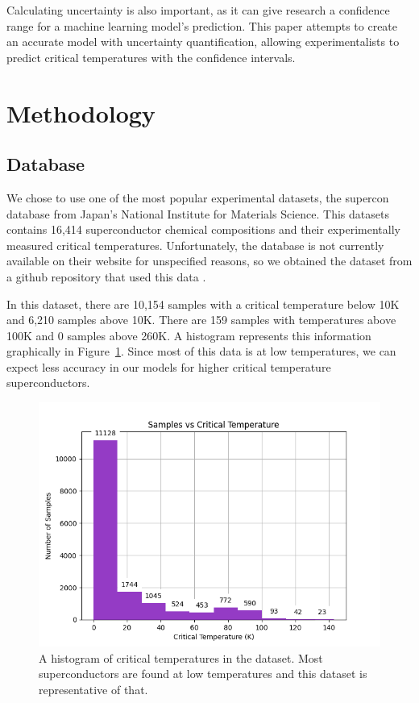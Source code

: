 \documentclass[twocolumn, nofootinbib, secnumarabic, amssymb, nobibnotes, aps, prd]{revtex4-2}
\begin{document}
Calculating uncertainty is also important, as it can give research a confidence range for a machine learning model's prediction. This paper attempts to create an accurate model with uncertainty quantification, allowing experimentalists to predict critical temperatures with the confidence intervals.

\section{Methodology}
\subsection{Database}
We chose to use one of the most popular experimental datasets, the supercon database from Japan's National Institute for Materials Science. This datasets contains 16,414 superconductor chemical compositions and their experimentally measured critical temperatures. Unfortunately, the database is not currently available on their website for unspecified reasons, so we obtained the dataset from a github repository that used this data \cite{vstanev1_2018}. 

In this dataset, there are 10,154 samples with a critical temperature below 10K and 6,210 samples above 10K. There are 159 samples with temperatures above 100K and 0 samples above 260K. A histogram represents this information graphically in Figure~\ref{fig:data-histogram}. Since most of this data is at low temperatures, we can expect less accuracy in our models for higher critical temperature superconductors.

 \begin{figure}[!htb]
    \centering %
    \includegraphics[width=\columnwidth]{images/dataset_histogram.png}
    \caption{A histogram of critical temperatures in the dataset. Most superconductors are found at low temperatures and this dataset is representative of that.} %
    \label{fig:data-histogram}
 \end{figure}
\end{document}
